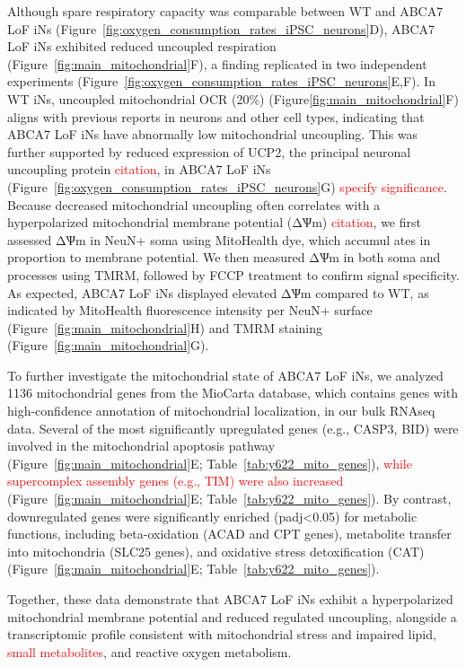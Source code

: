 Although spare respiratory capacity was comparable between WT and ABCA7 LoF iNs (Figure~\ref{fig:oxygen_consumption_rates_iPSC_neurons}D), ABCA7 LoF iNs exhibited reduced uncoupled respiration (Figure~\ref{fig:main_mitochondrial}F), a finding replicated in two independent experiments (Figure~\ref{fig:oxygen_consumption_rates_iPSC_neurons}E,F). In WT iNs, uncoupled mitochondrial OCR (20\%) (Figure\ref{fig:main_mitochondrial}F) aligns with previous reports in neurons and other cell types\cite{Divakaruni2011-uj,Jekabsons2004-fn}, indicating that ABCA7 LoF iNs have abnormally low mitochondrial uncoupling. This was further supported by reduced expression of UCP2, the principal neuronal uncoupling protein \textcolor{red}{citation}, in ABCA7 LoF iNs (Figure~\ref{fig:oxygen_consumption_rates_iPSC_neurons}G) \textcolor{red}{specify significance}. Because decreased mitochondrial uncoupling often correlates with a hyperpolarized mitochondrial membrane potential (ΔѰm) \textcolor{red}{citation}, we first assessed ΔѰm in NeuN+ soma using MitoHealth dye, which accumul   ates in proportion to membrane potential. We then measured ΔѰm in both soma and processes using TMRM, followed by FCCP treatment to confirm signal specificity. As expected, ABCA7 LoF iNs displayed elevated ΔѰm compared to WT, as indicated by MitoHealth fluorescence intensity per NeuN+ surface (Figure~\ref{fig:main_mitochondrial}H) and TMRM staining (Figure~\ref{fig:main_mitochondrial}G).

To further investigate the mitochondrial state of ABCA7 LoF iNs, we analyzed 1136 mitochondrial genes from the MioCarta database, which contains genes with high-confidence annotation of mitochondrial localization, in our bulk RNAseq data. Several of the most significantly upregulated genes (e.g., CASP3, BID) were involved in the mitochondrial apoptosis pathway (Figure~\ref{fig:main_mitochondrial}E; Table~\ref{tab:y622_mito_genes}), \textcolor{red}{while supercomplex assembly genes (e.g., TIM) were also increased} (Figure~\ref{fig:main_mitochondrial}E; Table~\ref{tab:y622_mito_genes}). By contrast, downregulated genes were significantly enriched (padj<0.05) for metabolic functions, including beta-oxidation (ACAD and CPT genes), metabolite transfer into mitochondria (SLC25 genes), and oxidative stress detoxification (CAT) (Figure~\ref{fig:main_mitochondrial}E; Table~\ref{tab:y622_mito_genes}).

Together, these data demonstrate that ABCA7 LoF iNs exhibit a hyperpolarized mitochondrial membrane potential and reduced regulated uncoupling, alongside a transcriptomic profile consistent with mitochondrial stress and impaired lipid, \textcolor{red}{small metabolites}, and reactive oxygen metabolism.

